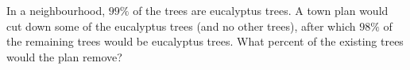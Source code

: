 In a neighbourhood, $99\%$ of the trees are eucalyptus trees. A town plan would cut down some of the eucalyptus trees (and no other trees), after which $98\%$ of the remaining trees would be eucalyptus trees. What percent of the existing trees would the plan remove?
